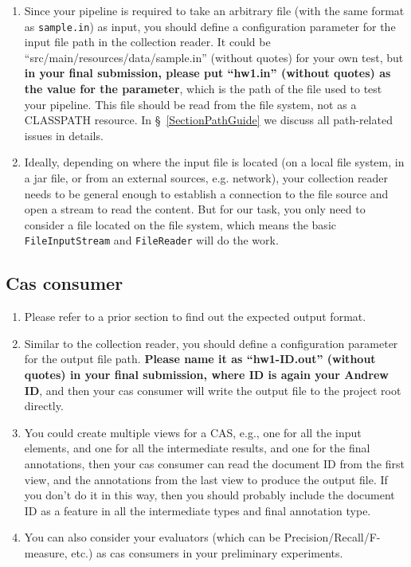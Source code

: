 \begin{enumerate}

\item Since your pipeline is required to take an arbitrary file (with the same
format as \texttt{sample.in}) as input, you should define a configuration
parameter for the input file path in the collection reader. It could be
``src/main/resources/data/sample.in'' (without quotes) for your own test, but
\textbf{in your final submission, please put ``hw1.in'' (without quotes) as the
value for the parameter}, which is the path of the file used to test your
pipeline. This file should be read from the file system, not as a CLASSPATH resource.
In \S~\ref{SectionPathGuide} we discuss all path-related issues
in details.

\item Ideally, depending on where the input file is located (on a local file
system, in a jar file, or from an external sources, e.g. network), your
collection reader needs to be general enough to establish a connection to the
file source and open a stream to read the content. But for our task, you only
need to consider a file located on the file system, which means the basic
\texttt{FileInputStream} and \texttt{FileReader} will do the work.

\end{enumerate}

\subsection{Cas consumer}

\begin{enumerate}
  
\item Please refer to a prior section to find out the expected output format.

\item Similar to the collection reader, you should define a configuration
parameter for the output file path. \textbf{Please name it as ``hw1-ID.out''
(without quotes) in your final submission, where ID is again your Andrew ID},
and then your cas consumer will write the output file to the project root
directly.

\item You could create multiple views for a CAS, e.g., one for all the input
elements, and one for all the intermediate results, and one for the final
annotations, then your cas consumer can read the document ID from the first
view, and the annotations from the last view to produce the output file. If you
don't do it in this way, then you should probably include the document ID as a
feature in all the intermediate types and final annotation type.

\item You can also consider your evaluators (which can be
Precision/Recall/F-measure, etc.) as cas consumers in your preliminary
experiments.

\end{enumerate}

